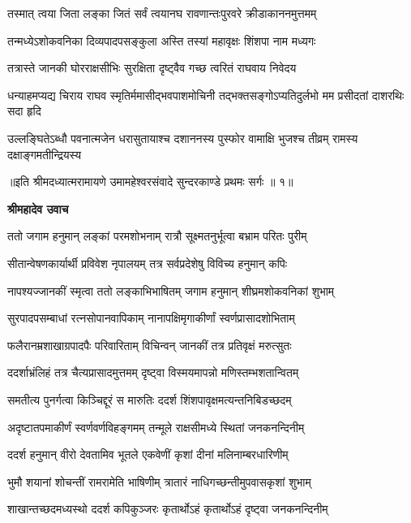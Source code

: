 \twolineshloka
{तस्मात् त्वया जिता लङ्का जितं सर्वं त्वयानघ}
{रावणान्तःपुरवरे क्रीडाकाननमुत्तमम्} %

\twolineshloka
{तन्मध्येऽशोकवनिका दिव्यपादपसङ्कुला}
{अस्ति तस्यां महावृक्षः शिंशपा नाम मध्यगः} %

\twolineshloka
{तत्रास्ते जानकी घोरराक्षसीभिः सुरक्षिता}
{दृष्ट्वैव गच्छ त्वरितं राघवाय निवेदय} %

\fourlineindentedshloka
{धन्याहमप्यद्य चिराय राघव\-}
{स्मृतिर्ममासीद्भवपाशमोचिनी}
{तद्भक्तसङ्गोऽप्यतिदुर्लभो मम}
{प्रसीदतां दाशरथिः सदा हृदि} %

\fourlineindentedshloka
{उल्लङ्घितेऽब्धौ पवनात्मजेन}
{धरासुतायाश्च दशाननस्य}
{पुस्फोर वामाक्षि भुजश्च तीव्रम्}
{रामस्य दक्षाङ्गमतीन्द्रियस्य} %

{॥इति श्रीमदध्यात्मरामायणे उमामहेश्वरसंवादे सुन्दरकाण्डे
प्रथमः सर्गः ॥ १॥
}




\textbf{श्रीमहादेव उवाच}

\twolineshloka
{ततो जगाम हनुमान् लङ्कां परमशोभनाम्}
{रात्रौ सूक्ष्मतनुर्भूत्वा बभ्राम परितः पुरीम्} %

\twolineshloka
{सीतान्वेषणकार्यार्थी प्रविवेश नृपालयम्}
{तत्र सर्वप्रदेशेषु विविच्य हनुमान् कपिः} %

\twolineshloka
{नापश्यज्जानकीं स्मृत्वा ततो लङ्काभिभाषितम्}
{जगाम हनुमान् शीघ्रमशोकवनिकां शुभाम्} %

\twolineshloka
{सुरपादपसम्बाधां रत्नसोपानवापिकाम्}
{नानापक्षिमृगाकीर्णां स्वर्णप्रासादशोभिताम्} %

\twolineshloka
{फलैरानम्रशाखाग्रपादपैः परिवारिताम्}
{विचिन्वन् जानकीं तत्र प्रतिवृक्षं मरुत्सुतः} %

\twolineshloka
{ददर्शाभ्रंलिहं तत्र चैत्यप्रासादमुत्तमम्}
{दृष्ट्वा विस्मयमापन्नो मणिस्तम्भशतान्वितम्} %

\twolineshloka
{समतीत्य पुनर्गत्वा किञ्चिद्दूरं स मारुतिः}
{ददर्श शिंशपावृक्षमत्यन्तनिबिडच्छदम्} %

\twolineshloka
{अदृष्टातपमाकीर्णं स्वर्णवर्णविहङ्गमम्}
{तन्मूले राक्षसीमध्ये स्थितां जनकनन्दिनीम्} %

\twolineshloka
{ददर्श हनुमान् वीरो देवतामिव भूतले}
{एकवेणीं कृशां दीनां मलिनाम्बरधारिणीम्} %

\twolineshloka
{भुमौ शयानां शोचन्तीं रामरामेति भाषिणीम्}
{त्रातारं नाधिगच्छन्तीमुपवासकृशां शुभाम्} %

\twolineshloka
{शाखान्तच्छदमध्यस्थो ददर्श कपिकुञ्जरः}
{कृतार्थोऽहं कृतार्थोऽहं दृष्ट्वा जनकनन्दिनीम्} %

